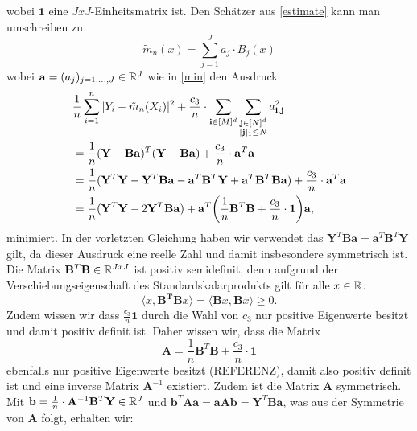 wobei $\mathbf{1}$ eine $JxJ$-Einheitsmatrix ist.
Den Schätzer aus \ref{estimate} kann man umschreiben zu 
$$ \tilde{m}_n(x) = \sum_{j = 1}^J a_j \cdot B_j(x)$$
wobei $\mathbf{a} = (a_j)_{j = 1,\dots,J} \in \mathbb{R}^J$ wie in \ref{min} den Ausdruck
\begin{equation}
\begin{split}
& \frac{1}{n} \sum_{i = 1}^n|Y_i - \tilde{m}_n(X_i)|^2 + \frac{c_3}{n} \cdot \sum_{\mathbf{i} \in [M]^d} \sum_{\substack{\mathbf{j} \in [N]^d\\|\mathbf{j}|_1 \leq N}} a_{\mathbf{i},\mathbf{j}}^2 \\
& = \frac{1}{n}(\mathbf{Y} - \mathbf{B}\mathbf{a})^T(\mathbf{Y} - \mathbf{B}\mathbf{a}) + \frac{c_3}{n} \cdot \mathbf{a}^T\mathbf{a} \\
& = \frac{1}{n}(\mathbf{Y}^T\mathbf{Y} - \mathbf{Y}^T\mathbf{B}\mathbf{a} - \mathbf{a}^T\mathbf{B}^T\mathbf{Y} + \mathbf{a}^T\mathbf{B}^T\mathbf{B}\mathbf{a}) + \frac{c_3}{n} \cdot \mathbf{a}^T\mathbf{a} \\
& = \frac{1}{n}(\mathbf{Y}^T\mathbf{Y} - 2\mathbf{Y}^T\mathbf{B}\mathbf{a}) + \mathbf{a}^T\bigg(\frac{1}{n} \mathbf{B}^T\mathbf{B} + \frac{c_3}{n} \cdot \mathbf{1}\bigg) \mathbf{a}, 
\end{split}
\end{equation} 
minimiert. In der vorletzten Gleichung haben wir verwendet das $\mathbf{Y}^T\mathbf{B}\mathbf{a} = \mathbf{a}^T\mathbf{B}^T\mathbf{Y}$ gilt, da dieser Ausdruck eine reelle Zahl und damit insbesondere symmetrisch ist. 
Die Matrix $\mathbf{B}^T\mathbf{B} \in \mathbb{R}^{JxJ}$ ist positiv semidefinit, denn aufgrund der Verschiebungseigenschaft des Standardskalarprodukts gilt für alle $x \in \mathbb{R}\colon$
$$\langle x, \mathbf{B^T}\mathbf{B} x\rangle = \langle \mathbf{B} x, \mathbf{B} x\rangle \geq 0.$$
Zudem wissen wir dass $\frac{c_3}{n}\mathbf{1}$ durch die Wahl von $c_3$ nur positive Eigenwerte besitzt und damit positiv definit ist.  
Daher wissen wir, dass die Matrix
$$\mathbf{A} = \frac{1}{n}\mathbf{B}^T\mathbf{B} + \frac{c_3}{n} \cdot \mathbf{1}$$ ebenfalls nur positive Eigenwerte besitzt (REFERENZ), damit also positiv definit ist und eine inverse Matrix $\mathbf{A}^{-1}$ existiert. Zudem ist die Matrix $\mathbf{A}$ symmetrisch. 
Mit $\mathbf{b} = \frac{1}{n} \cdot \mathbf{A}^{-1}\mathbf{B}^T\mathbf{Y} \in \mathbb{R}^J$ und $\mathbf{b}^T\mathbf{A}\mathbf{a} = \mathbf{a}\mathbf{A}\mathbf{b} = \mathbf{Y}^T\mathbf{B}\mathbf{a}$, was aus der Symmetrie von $\mathbf{A}$ folgt, erhalten wir$\colon$
